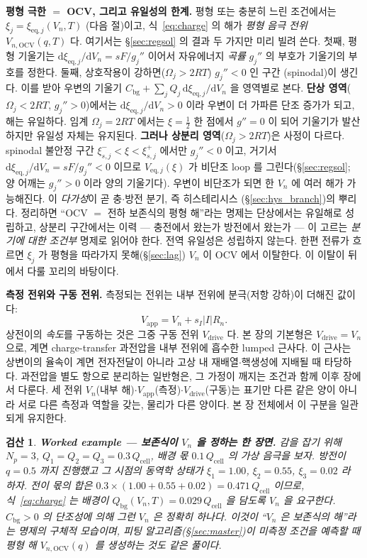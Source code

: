 \documentclass[11pt,a4paper]{article}
\newtheorem*{verifybox}{검산}
\newcommand{\dd}{\mathrm{d}}
\newcommand{\eq}{\mathrm{eq}}
\newcommand{\app}{\mathrm{app}}
\newcommand{\drive}{\mathrm{drive}}
\newcommand{\cell}{\mathrm{cell}}
\newcommand{\bg}{\mathrm{bg}}
\newcommand{\OCV}{\mathrm{OCV}}
\begin{document}
\textbf{평형 극한 $=$ OCV, 그리고 유일성의 한계.} 평형 또는 충분히 느린 조건에서는 $\xi_j=\xi_{\eq,j}(V_n,T)$
(다음 절)이고, 식~\eqref{eq:charge} 의 해가 \emph{평형 음극 전위} $V_{n,\OCV}(q,T)$ 다. 여기서는 \S\ref{sec:regsol}
의 결과 두 가지만 미리 빌려 쓴다. 첫째, 평형 기울기는 $\dd\xi_{\eq,j}/\dd V_n=sF/g_j''$ 이어서 자유에너지
\emph{곡률} $g_j''$ 의 부호가 기울기의 부호를 정한다. 둘째, 상호작용이 강하면($\Omega_j>2RT$) $g_j''<0$ 인 구간
(spinodal)이 생긴다. 이를 받아 우변의 기울기 $C_\bg+\sum_j Q_j\,\dd\xi_{\eq,j}/\dd V_n$ 을 영역별로 본다.
\textbf{단상 영역}($\Omega_j<2RT$, $g_j''>0$)에서는 $\dd\xi_{\eq,j}/\dd V_n>0$ 이라 우변이 더 가파른 단조 증가가
되고, 해는 유일하다. 임계 $\Omega_j=2RT$ 에서는 $\xi=\tfrac12$ 한 점에서 $g''=0$ 이 되어 기울기가 발산하지만
유일성 자체는 유지된다. \textbf{그러나 상분리 영역}($\Omega_j>2RT$)은 사정이 다르다. spinodal 불안정 구간
$\xi_{s,j}^-<\xi<\xi_{s,j}^+$ 에서만 $g_j''<0$ 이고, 거기서 $\dd\xi_{\eq,j}/\dd V_n=sF/g_j''<0$ 이므로
$V_{\eq,j}(\xi)$ 가 비단조 loop 를 그린다(\S\ref{sec:regsol}; 양 어깨는 $g_j''>0$ 이라 양의 기울기다). 우변이
비단조가 되면 한 $V_n$ 에 여러 해가 가능해진다. 이 \emph{다가성}이 곧 충$\cdot$방전 분기, 즉 히스테리시스
(\S\ref{sec:hys_branch})의 뿌리다. 정리하면 ``OCV $=$ 전하 보존식의 평형 해''라는 명제는 단상에서는 유일해로
성립하고, 상분리 구간에서는 이력 — 충전에서 왔는가 방전에서 왔는가 — 이 고르는 \emph{분기에 대한 조건부} 명제로
읽어야 한다. 전역 유일성은 성립하지 않는다. 한편 전류가 흐르면 $\xi_j$ 가 평형을 따라가지 못해(\S\ref{sec:lag})
$V_n$ 이 OCV 에서 이탈한다. 이 이탈이 뒤에서 다룰 꼬리의 바탕이다.

\textbf{측정 전위와 구동 전위.} 측정되는 전위는 내부 전위에 분극(저항 강하)이 더해진 값이다:
\begin{equation}
V_\app=V_n+s_I|I|R_n.
\label{eq:vapp}
\end{equation}
상전이의 \emph{속도}를 구동하는 것은 그중 구동 전위 $V_\drive$ 다. 본 장의 기본형은 $V_\drive=V_n$ 으로, 계면
charge-transfer 과전압을 내부 전위에 흡수한 lumped 근사다. 이 근사는 상변이의 율속이 계면 전자전달이 아니라 고상
내 재배열$\cdot$핵생성에 지배될 때 타당하다. 과전압을 별도 항으로 분리하는 일반형은, 그 가정이 깨지는 조건과 함께
이후 장에서 다룬다. 세 전위 $V_n$(내부 해)$\cdot$$V_\app$(측정)$\cdot$$V_\drive$(구동)는 표기만 다른 같은 양이
아니라 서로 다른 측정과 역할을 갖는, 물리가 다른 양이다. 본 장 전체에서 이 구분을 일관되게 유지한다.

\begin{verifybox}
\textbf{Worked example — 보존식이 $V_n$ 을 정하는 한 장면.} 감을 잡기 위해 $N_p=3$,
$Q_1=Q_2=Q_3=0.3\,Q_\cell$, 배경 몫 $0.1\,Q_\cell$ 의 가상 음극을 보자. 방전이 $q=0.5$ 까지 진행했고 그
시점의 동역학 상태가 $\xi_1=1.00$, $\xi_2=0.55$, $\xi_3=0.02$ 라 하자. 전이 몫의 합은
$0.3\times(1.00+0.55+0.02)=0.471\,Q_\cell$ 이므로, 식~\eqref{eq:charge} 는 배경이
$Q_\bg(V_n,T)=0.029\,Q_\cell$ 을 담도록 $V_n$ 을 요구한다. $C_\bg>0$ 의 단조성에 의해 그런 $V_n$ 은 정확히
하나다. 이것이 ``$V_n$ 은 보존식의 해''라는 명제의 구체적 모습이며, 피팅 알고리즘(\S\ref{sec:master})이
미측정 조건을 예측할 때 평형 해 $V_{n,\OCV}(q)$ 를 생성하는 것도 같은 풀이다.
\end{verifybox}
\end{document}
